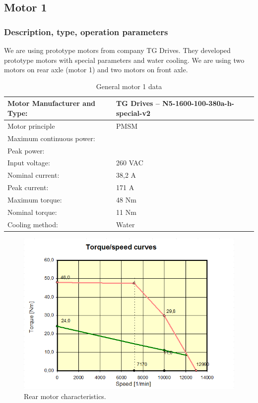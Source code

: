 \subsection{Motor 1}

\subsubsection{Description, type, operation parameters}

We are using prototype motors from company TG Drives. They developed prototype motors with special parameters and water cooling. We are using two motors on rear axle (motor 1) and two motors on front axle.
\begin{table}[H]
	\centering
	\caption{General motor 1 data}
	\begin{tabularx}{\textwidth}{|X|X|}\hline
		Motor Manufacturer and Type: & TG Drives – N5-1600-100-380a-h-special-v2 \\[\TableSize]\hline
		Motor principle & PMSM \\[\TableSize]\hline
		Maximum continuous power: &  \\[\TableSize]\hline
		Peak power: &  \\[\TableSize]\hline
		Input voltage: & 260 VAC \\[\TableSize]\hline
		Nominal current: & 38,2 A \\[\TableSize]\hline
		Peak current: & 171 A \\[\TableSize]\hline
		Maximum torque: & 48 Nm \\[\TableSize]\hline
		Nominal torque: & 11 Nm \\[\TableSize]\hline
		Cooling method: & Water \\[\TableSize]\hline
	\end{tabularx}%
	\label{tab:motors1-general}%
\end{table}%

\begin{figure}[H]
	\centering
	\includegraphics[width=\textwidth]{./img/MOTOR1-torque.png}
	\caption{Rear motor characteristics.}
	\label{fig:torque1}
\end{figure}


